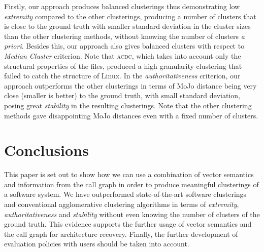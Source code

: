 \documentclass[sigconf]{acmart}
\begin{document}
Firstly, our approach produces balanced clusterings thus demonstrating low \emph{extremity} compared to the other clusterings, 
producing a number of clusters that is close to the ground truth with smaller standard deviation in the cluster sizes than 
the other clustering methods, without knowing the number of clusters \emph{a priori}. 
Besides this, our approach also gives balanced clusters with respect to \emph{Median Cluster} criterion. 
Note that \textsc{acdc}, which takes into account only the structural properties of the files, produced a high 
granularity clustering that failed to catch the structure of Linux. 
In the \emph{authoritativeness} criterion, our approach outperforms the other clusterings
in terms of MoJo distance being very close (smaller is better) to the ground truth, with small standard deviation, posing great \emph{stability} in the resulting clusterings. 
Note that the other clustering methods gave disappointing MoJo distances even with a fixed number of clusters. 



\section{Conclusions} 

This paper is set out to show how we can use a combination of vector semantics
and information from the call graph in order to produce meaningful clusterings of a software system.
We have outperformed state-of-the-art software clusterings and conventional
agglomerative clustering algorithms 
in terms of \emph{extremity}, \emph{authoritativeness} and \emph{stability} 
without even knowing the number of clusters of the ground truth. This evidence 
supports the further usage of vector semantics and the call graph for architecture recovery.
Finally, the further development of evaluation policies with users should be taken into account. 


\newpage


\end{document}
